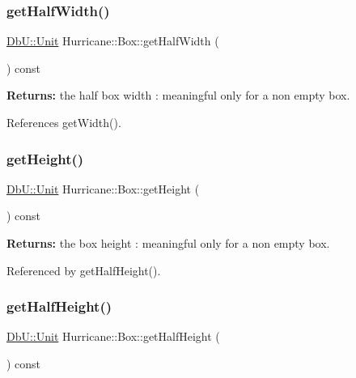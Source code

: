 \subsubsection{\texorpdfstring{get\+Half\+Width()}{getHalfWidth()}}
{\footnotesize\ttfamily \mbox{\hyperlink{group__DbUGroup_ga4fbfa3e8c89347af76c9628ea06c4146}{Db\+U\+::\+Unit}} Hurricane\+::\+Box\+::get\+Half\+Width (\begin{DoxyParamCaption}{ }\end{DoxyParamCaption}) const\hspace{0.3cm}{\ttfamily [inline]}}

{\bfseries Returns\+:} the half box width \+: meaningful only for a non empty box. 

References get\+Width().

\mbox{\label{classHurricane_1_1Box_a7b15b9488d49da1fc666c0383fb213ab}} 
\subsubsection{\texorpdfstring{get\+Height()}{getHeight()}}
{\footnotesize\ttfamily \mbox{\hyperlink{group__DbUGroup_ga4fbfa3e8c89347af76c9628ea06c4146}{Db\+U\+::\+Unit}} Hurricane\+::\+Box\+::get\+Height (\begin{DoxyParamCaption}{ }\end{DoxyParamCaption}) const\hspace{0.3cm}{\ttfamily [inline]}}

{\bfseries Returns\+:} the box height \+: meaningful only for a non empty box. 

Referenced by get\+Half\+Height().

\mbox{\label{classHurricane_1_1Box_a5c94554a78398c4a5c7dedd024926abb}} 
\subsubsection{\texorpdfstring{get\+Half\+Height()}{getHalfHeight()}}
{\footnotesize\ttfamily \mbox{\hyperlink{group__DbUGroup_ga4fbfa3e8c89347af76c9628ea06c4146}{Db\+U\+::\+Unit}} Hurricane\+::\+Box\+::get\+Half\+Height (\begin{DoxyParamCaption}{ }\end{DoxyParamCaption}) const\hspace{0.3cm}{\ttfamily [inline]}}


